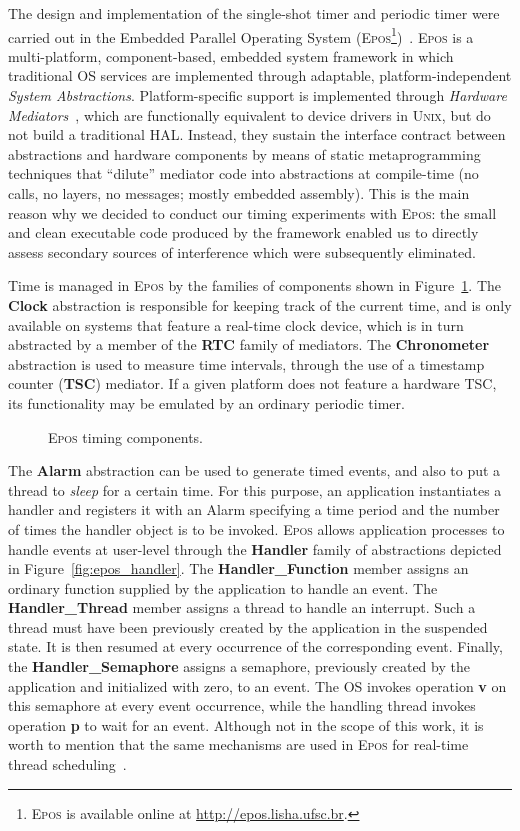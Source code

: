 \documentclass[final,3pd,times]{elsarticle}
\newcommand{\fig}[4][tbp]{
  \begin{figure}[#1]
    {\centering{\texttt{[image: \#2]}}\par}
    \caption{#3}
    \label{fig:#2}
  \end{figure}
}
\newcommand{\class}[1]{{\sffamily\bfseries{#1}}}
\newcommand{\method}[1]{\class{#1}}
\begin{document}
The design and implementation of the single-shot timer and periodic
timer were carried out in the Embedded Parallel Operating System
(\textsc{Epos}\footnote{\textsc{Epos} is available online at
  \url{http://epos.lisha.ufsc.br}.})~\cite{Froehlich:2001}.
\textsc{Epos} is a multi-platform, component-based, embedded system
framework in which traditional OS services are implemented through
adaptable, platform-independent \emph{System Abstractions}.
Platform-specific support is implemented through \emph{Hardware
  Mediators}~\cite{Polpeta:2004}, which are functionally equivalent to
device drivers in \textsc{Unix}, but do not build a traditional HAL.
Instead, they sustain the interface contract between abstractions and
hardware components by means of static metaprogramming techniques that
``dilute'' mediator code into abstractions at compile-time (no calls, no
layers, no messages; mostly embedded assembly). This is the main reason
why we decided to conduct our timing experiments with \textsc{Epos}: the
small and clean executable code produced by the framework enabled us to
directly assess secondary sources of interference which were
subsequently eliminated.

Time is managed in \textsc{Epos} by the families of components shown in
Figure~\ref{fig:epos_time}. The \class{Clock} abstraction is responsible
for keeping track of the current time, and is only available on systems
that feature a real-time clock device, which is in turn abstracted by a
member of the \class{RTC} family of mediators.  The \class{Chronometer}
abstraction is used to measure time intervals, through the use of a
timestamp counter (\class{TSC}) mediator. If a given platform does not
feature a hardware TSC, its functionality may be emulated by an ordinary
periodic timer.

\fig[bht]{epos_time}{\textsc{Epos} timing components.}{scale=.6}

The \class{Alarm} abstraction can be used to generate timed events, and
also to put a thread to \emph{sleep} for a certain time.  For this
purpose, an application instantiates a handler and registers it with an
Alarm specifying a time period and the number of times the handler
object is to be invoked. \textsc{Epos} allows application processes to
handle events at user-level through the \class{Handler} family of
abstractions depicted in Figure~\ref{fig:epos_handler}. The
\class{Handler\_Function} member assigns an ordinary function supplied
by the application to handle an event. The \class{Handler\_Thread}
member assigns a thread to handle an interrupt. Such a thread must have
been previously created by the application in the suspended state. It is
then resumed at every occurrence of the corresponding event. Finally,
the \class{Handler\_Semaphore} assigns a semaphore, previously created
by the application and initialized with zero, to an event. The OS
invokes operation \method{v} on this semaphore at every event
occurrence, while the handling thread invokes operation \method{p} to
wait for an event. Although not in the scope of this work, it is worth
to mention that the same mechanisms are used in \textsc{Epos} for
real-time thread scheduling~\cite{Marcondes:2009}.
\end{document}
